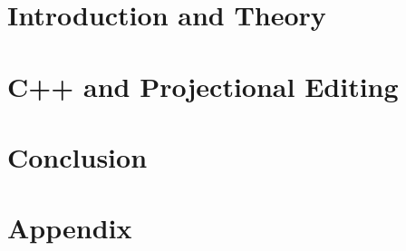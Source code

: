 \documentclass[11pt,a4paper,bibtotoc,idxtotoc,headsepline,footsepline,footexclude,BCOR12mm,DIV13,hidelinks]{scrbook}
\begin{document}
	\frontmatter
	
	
	
%	
%	
	
	
%	
	\clearemptydoublepage
	
	
	
	
	
	
	
	
	

	\tableofcontents
  
  

	\mainmatter
	
	
		\part[Introduction and Theory]{Introduction and Theory}
		\label{part:intro}
		
		
		
		\part[C++ and Projectional Editing]{C++ and Projectional Editing}
		\label{part:implementation}
		
		
		
		
		\part[Conclusion]{Conclusion}
		\label{part:conclusion}
		
		
		
		
		
		
		\part*{Appendix}
		
		\appendix %
		
		
		
	


  \clearemptydoublepage
  
	
	
 
\end{document}
